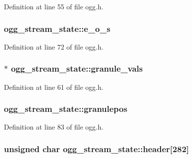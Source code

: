 Definition at line 55 of file ogg.\+h.

\subsubsection[{\texorpdfstring{e\+\_\+o\+\_\+s}{e_o_s}}]{ ogg\+\_\+stream\+\_\+state\+::e\+\_\+o\+\_\+s}\hypertarget{structogg__stream__state_a366e94e72849e0e880d53a22bb9ee646}{}\label{structogg__stream__state_a366e94e72849e0e880d53a22bb9ee646}


Definition at line 72 of file ogg.\+h.

\subsubsection[{\texorpdfstring{granule\+\_\+vals}{granule_vals}}]{$\ast$ ogg\+\_\+stream\+\_\+state\+::granule\+\_\+vals}\hypertarget{structogg__stream__state_a5ddadad0bd4d5c5381b21da6f11a7d0c}{}\label{structogg__stream__state_a5ddadad0bd4d5c5381b21da6f11a7d0c}


Definition at line 61 of file ogg.\+h.

\subsubsection[{\texorpdfstring{granulepos}{granulepos}}]{ ogg\+\_\+stream\+\_\+state\+::granulepos}\hypertarget{structogg__stream__state_a5df750c600660686e29f24b4d1ce836c}{}\label{structogg__stream__state_a5df750c600660686e29f24b4d1ce836c}


Definition at line 83 of file ogg.\+h.

\subsubsection[{\texorpdfstring{header}{header}}]{\setlength{\rightskip}{0pt plus 5cm}unsigned char ogg\+\_\+stream\+\_\+state\+::header\mbox{[}282\mbox{]}}\hypertarget{structogg__stream__state_aeb8496ef8051c2760c5d57424f30171a}{}\label{structogg__stream__state_aeb8496ef8051c2760c5d57424f30171a}


